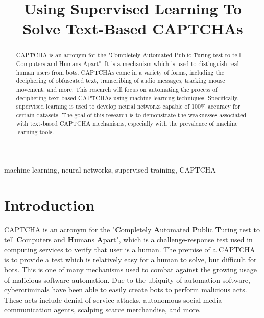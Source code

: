\documentclass[11pt,conference]{IEEEtran}
\begin{document}
\title{Using Supervised Learning To Solve Text-Based CAPTCHAs\\
}

\author{
}

\maketitle

\begin{abstract}
    CAPTCHA is an acronym for the "Completely Automated Public Turing test
    to tell Computers and Humans Apart". It is a mechanism which is used to
    distinguish real human users from bots. CAPTCHAs come in a variety of forms,
    including the deciphering of obfuscated text, transcribing of audio messages,
    tracking mouse movement, and more. This research will focus on automating the
    process of deciphering text-based CAPTCHAs using machine learning
    techniques. Specifically, supervised learning is used to develop
    neural networks capable of 100\% accuracy for certain datasets. The goal of
    this research is to demonstrate the weaknesses associated with text-based
    CAPTCHA mechanisms, especially with the prevalence of machine learning
    tools.
\end{abstract}

\begin{IEEEkeywords}
    machine learning, neural networks, supervised training, CAPTCHA
\end{IEEEkeywords}

\section{Introduction}
CAPTCHA is an acronym for the "\textbf{C}ompletely \textbf{A}utomated
\textbf{P}ublic \textbf{T}uring test to tell
\textbf{C}omputers and \textbf{H}umans \textbf{A}part", which is a
challenge-response test used in computing services to verify that user is a
human. The premise of a CAPTCHA is to provide a test which is relatively easy
for a human to solve, but difficult for bots. This is one of many 
mechanisms used to combat against the growing usage of malicious software
automation. Due to the ubiquity of automation software, cybercriminals have
been able to easily create bots to perform malicious acts. These acts include
denial-of-service attacks, autonomous social media communication agents,
scalping scarce merchandise, and more.
\end{document}
